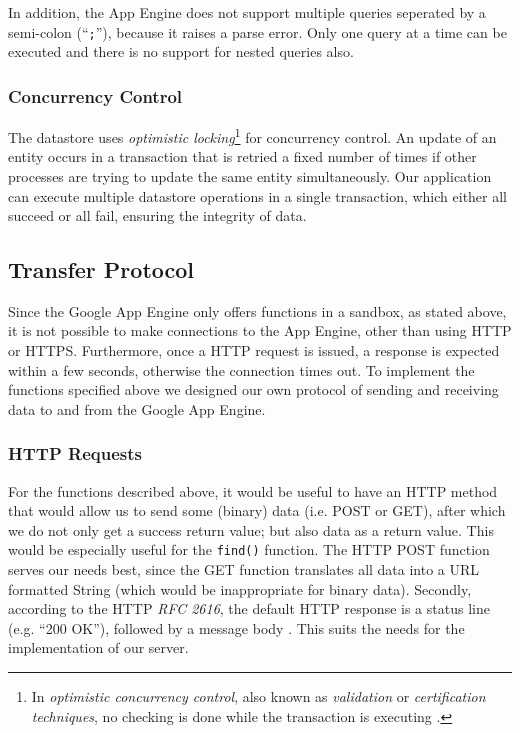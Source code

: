 In addition, the App Engine does not support multiple queries seperated by a
semi-colon (``\texttt{;}''), because it raises a parse error. Only one query at
a time can be executed and there is no support for nested queries also.

\subsubsection{Concurrency Control}
\label{serverdesign-transactions}
The datastore uses \emph{optimistic locking}\footnote{In \emph{optimistic
concurrency control}, also known as \emph{validation} or \emph{certification
techniques}, no checking is done while the transaction is executing
\cite{fundamentals-db}.} for concurrency control. An update of an entity occurs
in a transaction that is retried a fixed number of times if other processes are
trying to update the same entity simultaneously. Our application can execute
multiple datastore operations in a single transaction, which either all succeed
or all fail, ensuring the integrity of data.

\subsection{Transfer Protocol}
\label{serverdesign-transfer-protocol}
Since the Google App Engine only offers functions in a sandbox, as stated above,
it is not possible to make connections to the App Engine, other than using HTTP
or HTTPS. Furthermore, once a HTTP request is issued, a response is expected within
a few seconds, otherwise the connection times out. To implement the functions
specified above we designed our own protocol of sending and receiving data to
and from the Google App Engine.

\subsubsection{HTTP Requests}
For the functions described above, it would be useful to have an HTTP method that
would allow us to send some (binary) data (i.e. POST or GET), after which we do
not only get a success return value; but also data as a return value. This would
be especially useful for the \texttt{find()} function. The HTTP POST function
serves our needs best, since the GET function translates all data into a URL
formatted String (which would be inappropriate for binary data). Secondly,
according to the HTTP \emph{RFC 2616}, the default HTTP response is a status line
(e.g. ``200 OK''), followed by a message body \cite{rfc-2616}. This suits the
needs for the implementation of our server.


